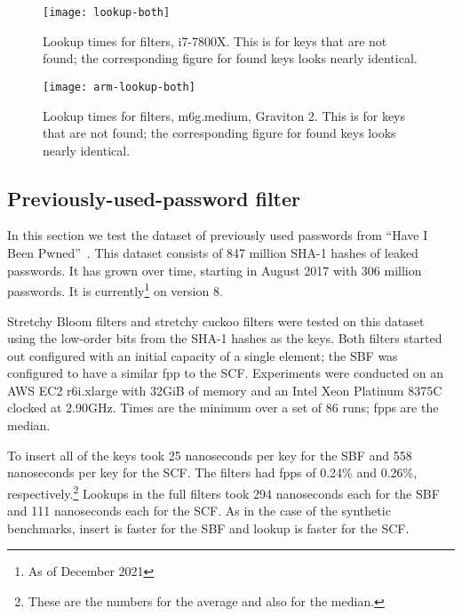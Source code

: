 \documentclass[letterpaper,twocolumn,10pt]{article}
\newcommand{\taffy}{stretchy}
\newcommand{\Taffy}{Stretchy}
\newcommand{\TBF}{SBF}
\newcommand{\TCF}{SCF}
\newcommand{\taffy}{taffy}
\newcommand{\Taffy}{Taffy}
\newcommand{\TBF}{TBF}
\newcommand{\TCF}{TCF}
\begin{document}
\begin{figure}[b!]
  \texttt{[image: lookup-both]}
  \caption{
    \label{lookup-both}
    Lookup times for filters, i7-7800X.
    This is for keys that are not found; the corresponding figure for found keys looks nearly identical.
  }
\end{figure}

\begin{figure}[b!]
  \texttt{[image: arm-lookup-both]}
  \caption{
    \label{arm-lookup-both}
    Lookup times for filters, m6g.medium, Graviton 2.
    This is for keys that are not found; the corresponding figure for found keys looks nearly identical.
  }
\end{figure}


\subsection{Previously-used-password filter}
\label{hibp}

In this section we test the dataset of previously used passwords from ``Have I Been Pwned''~\cite{pwned}.
This dataset consists of 847 million SHA-1 hashes of leaked passwords.
It has grown over time, starting in August 2017 with 306 million passwords. It is currently\footnote{As of December 2021} on version 8.

\Taffy{} Bloom filters and \taffy{} cuckoo filters were tested on this dataset using the low-order bits from the SHA-1 hashes as the keys.
Both filters started out configured with an initial capacity of a single element; the \TBF{} was configured to have a similar fpp to the \TCF{}.
Experiments were conducted on an AWS EC2 r6i.xlarge with 32GiB of memory and an Intel Xeon Platinum 8375C clocked at 2.90GHz.
Times are the minimum over a set of 86 runs; fpps are the median.

To insert all of the keys took 25 nanoseconds per key for the \TBF{} and 558 nanoseconds per key for the \TCF{}.
The filters had fpps of 0.24\% and 0.26\%, respectively.\footnote{These are the numbers for the average and also for the median.}
Lookups in the full filters took 294 nanoseconds each for the \TBF{} and 111 nanoseconds each for the \TCF{}.
As in the case of the synthetic benchmarks, insert is faster for the \TBF{} and lookup is faster for the \TCF{}.
\end{document}

